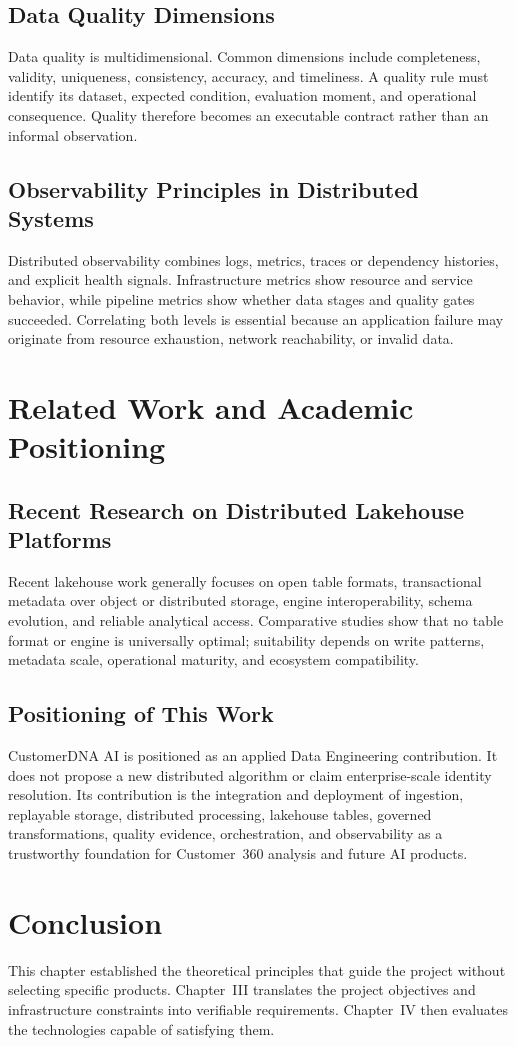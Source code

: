 \subsection{Data Quality Dimensions}
Data quality is multidimensional. Common dimensions include completeness, validity, uniqueness, consistency, accuracy, and timeliness. A quality rule must identify its dataset, expected condition, evaluation moment, and operational consequence. Quality therefore becomes an executable contract rather than an informal observation.

\subsection{Observability Principles in Distributed Systems}
Distributed observability combines logs, metrics, traces or dependency histories, and explicit health signals. Infrastructure metrics show resource and service behavior, while pipeline metrics show whether data stages and quality gates succeeded. Correlating both levels is essential because an application failure may originate from resource exhaustion, network reachability, or invalid data.

\section{Related Work and Academic Positioning}

\subsection{Recent Research on Distributed Lakehouse Platforms}
Recent lakehouse work generally focuses on open table formats, transactional metadata over object or distributed storage, engine interoperability, schema evolution, and reliable analytical access. Comparative studies show that no table format or engine is universally optimal; suitability depends on write patterns, metadata scale, operational maturity, and ecosystem compatibility.

\subsection{Positioning of This Work}
CustomerDNA AI is positioned as an applied Data Engineering contribution. It does not propose a new distributed algorithm or claim enterprise-scale identity resolution. Its contribution is the integration and deployment of ingestion, replayable storage, distributed processing, lakehouse tables, governed transformations, quality evidence, orchestration, and observability as a trustworthy foundation for Customer~360 analysis and future AI products.

\section{Conclusion}
This chapter established the theoretical principles that guide the project without selecting specific products. Chapter~III translates the project objectives and infrastructure constraints into verifiable requirements. Chapter~IV then evaluates the technologies capable of satisfying them.